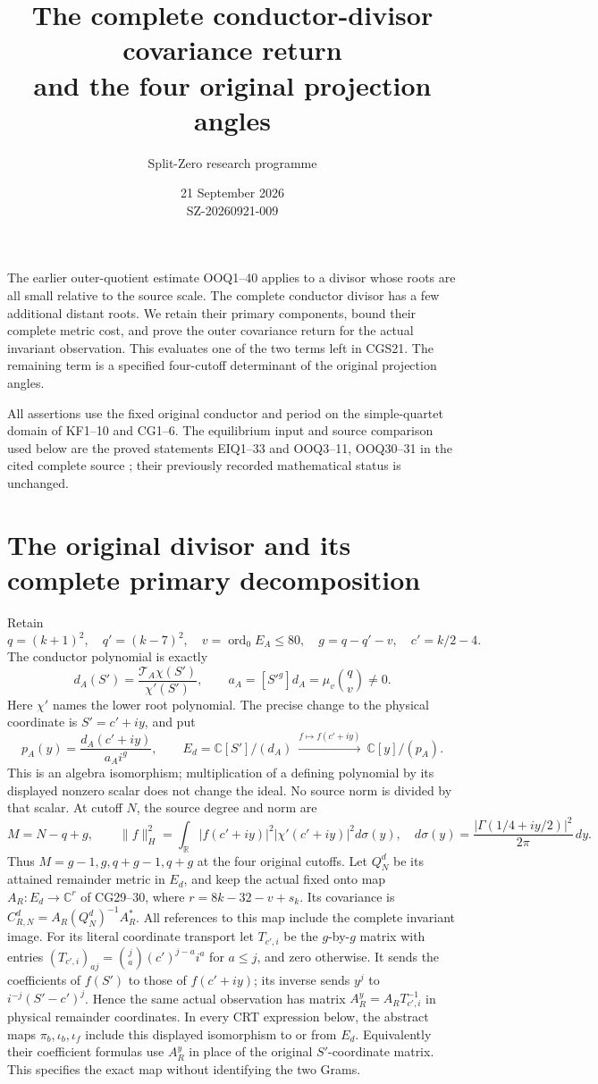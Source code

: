 \documentclass[11pt]{article}
\title{The complete conductor-divisor covariance return\\and the four original projection angles}
\author{Split-Zero research programme}
\date{21 September 2026\\SZ-20260921-009}
\newcommand{\C}{\mathbb C}
\begin{document}
\maketitle

The earlier outer-quotient estimate OOQ1--40 applies to a divisor
whose roots are all small relative to the source scale. The complete
conductor divisor has a few additional distant roots. We retain their
primary components, bound their complete metric cost, and prove the
outer covariance return for the actual invariant observation. This
evaluates one of the two terms left in CGS21. The remaining term is
a specified four-cutoff determinant of the original projection angles.

All assertions use the fixed original conductor and period on the
simple-quartet domain of KF1--10 and CG1--6. The equilibrium input and
source comparison used below are the proved statements EIQ1--33 and
OOQ3--11, OOQ30--31 in the cited complete source \cite{OOQ}; their
previously recorded mathematical status is unchanged.

\section{The original divisor and its complete primary decomposition}

Retain
\[
q=(k+1)^2,\quad q'=(k-7)^2,\quad v=\operatorname{ord}_0E_A\le80,
\quad g=q-q'-v,\quad c'=k/2-4.
\]
The conductor polynomial is exactly
\[
d_A(S')=\frac{\mathcal T_A\chi(S')}{\chi'(S')},\qquad
a_A=[S'^g]d_A=\mu_v\binom qv\ne0.
\]
Here \(\chi'\) names the lower root polynomial. The precise change
to the physical coordinate is \(S'=c'+iy\), and put
\[
p_A(y)=\frac{d_A(c'+iy)}{a_A i^g},\qquad
E_d=\C[S']/(d_A)\ \xrightarrow{f\mapsto f(c'+iy)}\
\C[y]/(p_A).
\tag{DCR1}
\]
This is an algebra isomorphism; multiplication of a defining
polynomial by its displayed nonzero scalar does not change the ideal.
No source norm is divided by that scalar. At cutoff \(N\), the source
degree and norm are
\[
M=N-q+g,\qquad
\|f\|_H^2=\int_{\mathbb R}
 |f(c'+iy)|^2|\chi'(c'+iy)|^2d\sigma(y),\quad
d\sigma(y)=\frac{|\Gamma(1/4+iy/2)|^2}{2\pi}\,dy.
\tag{DCR2}
\]
Thus \(M=g-1,g,q+g-1,q+g\) at the four original cutoffs.
Let \(Q_N^d\) be its attained remainder metric in \(E_d\), and keep
the actual fixed onto map \(A_R:E_d\to\C^r\) of CG29--30, where
\(r=8k-32-v+s_k\). Its covariance is
\(C_{R,N}^d=A_R(Q_N^d)^{-1}A_R^*\).
All references to this map include the complete invariant image.
For its literal coordinate transport let \(T_{c',i}\) be the
\(g\)-by-\(g\) matrix with entries
\((T_{c',i})_{aj}=\binom ja(c')^{j-a}i^a\) for \(a\le j\),
and zero otherwise. It sends the coefficients of \(f(S')\)
to those of \(f(c'+iy)\); its inverse sends \(y^j\) to
\(i^{-j}(S'-c')^j\). Hence the same actual observation has
matrix \(A_R^y=A_R T_{c',i}^{-1}\) in physical remainder
coordinates. In every CRT expression below, the abstract maps
\(\pi_b,\iota_b,\iota_f\) include this displayed isomorphism
to or from \(E_d\). Equivalently their coefficient formulas use
\(A_R^y\) in place of the original \(S'\)-coordinate matrix.
This specifies the exact map without identifying the two Grams.
\end{document}
